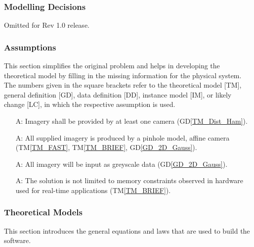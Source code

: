 \documentclass[12pt]{article}
\newcommand{\dref}[1]{GD\ref{#1}}
\newcommand{\tref}[1]{TM\ref{#1}}
\newcounter{assumpnum} %
\begin{document}
\subsubsection{Modelling Decisions}
Omitted for Rev 1.0 release.

\subsubsection{Assumptions} \label{sec_assumpt}
This section simplifies the original problem and helps in developing the
theoretical model by filling in the missing information for the physical system.
The numbers given in the square brackets refer to the theoretical model [TM],
general definition [GD], data definition [DD], instance model [IM], or likely
change [LC], in which the respective assumption is used.

\begin{itemize}
\item[A\refstepcounter{assumpnum}\theassumpnum \label{A_min_num_cameras}:]
Imagery shall be provided by at least one camera (\dref{TM_Dist_Ham}).

\item[A\refstepcounter{assumpnum}\theassumpnum \label{A_camera_model}:]
All supplied imagery is produced by a pinhole model, affine camera 
(\tref{TM_FAST}, \tref{TM_BRIEF}, \dref{GD_2D_Gauss}).

\item[A\refstepcounter{assumpnum}\theassumpnum \label{A_greyscale}:]
All imagery will be input as greyscale data (\dref{GD_2D_Gauss}).

\item[A\refstepcounter{assumpnum}\theassumpnum \label{A_RT_Memory}:]
The solution is not limited to memory constraints observed in hardware used for real-time 
applications (\tref{TM_BRIEF}).

\end{itemize}

\subsubsection{Theoretical Models}\label{sec_theoretical}
This section introduces the general equations and laws that are used to build the 
\progname{} software.

~\newline
\end{document}
